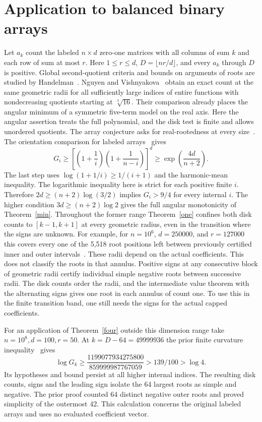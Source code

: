 \documentclass[11pt]{article}
\begin{document}
\section*{Application to balanced binary arrays}
Let $a_k$ count the labeled $n\times d$ zero-one matrices with all columns of sum $k$ and each row of sum at most $r$. Here $1\le r\le d$, $D=\lfloor nr/d\rfloor$, and every $a_k$ through $D$ is positive. Global second-quotient criteria and bounds on arguments of roots are studied by Handelman~\cite{handelman}. Nguyen and Vishnyakova~\cite{nv} obtain an exact count at the same geometric radii for all sufficiently large indices of entire functions with nondecreasing quotients starting at $\sqrt[3]{16}$. Their comparison already places the angular minimum of a symmetric five-term model on the real axis. Here the angular assertion treats the full polynomial, and the disk test is finite and allows unordered quotients. The array conjecture asks for real-rootedness at every size~\cite{alex}. The orientation comparison for labeled arrays~\cite{orientation} gives
\[
 G_i\ge\left[\left(1+\frac1i\right)
                  \left(1+\frac1{n-i}\right)\right]^d
     \ge \exp\!\left(\frac{4d}{n+2}\right).
\]
The last step uses $\log(1+1/i)\ge1/(i+1)$ and the harmonic-mean inequality. The logarithmic inequality here is strict for each positive finite $i$. Therefore $2d\ge(n+2)\log(3/2)$ implies $G_i>9/4$ for every internal $i$. The higher condition $3d\ge(n+2)\log 2$ gives the full angular monotonicity of Theorem~\ref{min}. Throughout the former range Theorem~\ref{one} confines both disk counts to $[k-1,k+1]$ at every geometric radius, even in the transition where the signs are unknown. For example, for $n=10^6$, $d=250000$, and $r=127000$ this covers every one of the 5,518 root positions left between previously certified inner and outer intervals~\cite{switching}. These radii depend on the actual coefficients. This does not classify the roots in that annulus. Positive signs at any consecutive block of geometric radii certify individual simple negative roots between successive radii. The disk counts order the radii, and the intermediate value theorem with the alternating signs gives one root in each annulus of count one. To use this in the finite transition band, one still needs the signs for the actual capped coefficients.

For an application of Theorem~\ref{four} outside this dimension range take $n=10^8,d=100,r=50$. At $k=D-64=49999936$ the prior finite curvature inequality~\cite{upper} gives
\[
 \log G_k\ge\frac{1199077934275800}{859999987767059}>139/100>\log 4.
\]
Its hypotheses and bound persist at all higher internal indices. The resulting disk counts, signs and the leading sign isolate the 64 largest roots as simple and negative. The prior proof counted 64 distinct negative outer roots and proved simplicity of the outermost 42. This calculation concerns the original labeled arrays and uses no evaluated coefficient vector.
\end{document}

